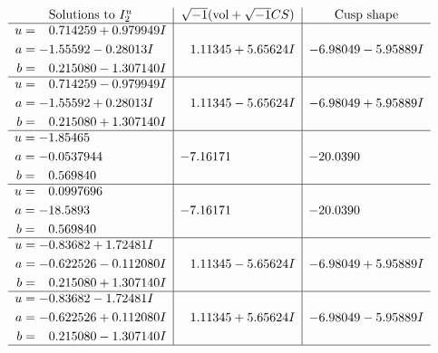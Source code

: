 \documentclass[1p]{elsarticle_modified}
\theoremstyle{definition}
\newcommand{\I}{\sqrt{-1}}
\begin{document}
$$\begin{array}{c|c|c}  
\text{Solutions to }I^u_{2}& \I (\text{vol} + \sqrt{-1}CS) & \text{Cusp shape}\\
 \hline 
\begin{aligned}
u &= \phantom{-}0.714259 + 0.979949 I \\
a &= -1.55592 - 0.28013 I \\
b &= \phantom{-}0.215080 - 1.307140 I\end{aligned}
 & \phantom{-}1.11345 + 5.65624 I & -6.98049 - 5.95889 I \\ \hline\begin{aligned}
u &= \phantom{-}0.714259 - 0.979949 I \\
a &= -1.55592 + 0.28013 I \\
b &= \phantom{-}0.215080 + 1.307140 I\end{aligned}
 & \phantom{-}1.11345 - 5.65624 I & -6.98049 + 5.95889 I \\ \hline\begin{aligned}
u &= -1.85465\phantom{ +0.000000I} \\
a &= -0.0537944\phantom{ +0.000000I} \\
b &= \phantom{-}0.569840\phantom{ +0.000000I}\end{aligned}
 & -7.16171\phantom{ +0.000000I} & -20.0390\phantom{ +0.000000I} \\ \hline\begin{aligned}
u &= \phantom{-}0.0997696\phantom{ +0.000000I} \\
a &= -18.5893\phantom{ +0.000000I} \\
b &= \phantom{-}0.569840\phantom{ +0.000000I}\end{aligned}
 & -7.16171\phantom{ +0.000000I} & -20.0390\phantom{ +0.000000I} \\ \hline\begin{aligned}
u &= -0.83682 + 1.72481 I \\
a &= -0.622526 - 0.112080 I \\
b &= \phantom{-}0.215080 + 1.307140 I\end{aligned}
 & \phantom{-}1.11345 - 5.65624 I & -6.98049 + 5.95889 I \\ \hline\begin{aligned}
u &= -0.83682 - 1.72481 I \\
a &= -0.622526 + 0.112080 I \\
b &= \phantom{-}0.215080 - 1.307140 I\end{aligned}
 & \phantom{-}1.11345 + 5.65624 I & -6.98049 - 5.95889 I\\
 \hline 
 \end{array}$$\newpage\newpage\renewcommand{\arraystretch}{1}
\end{document}
